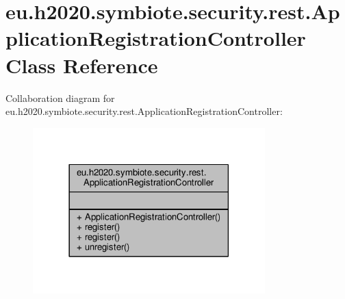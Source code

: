 \hypertarget{classeu_1_1h2020_1_1symbiote_1_1security_1_1rest_1_1ApplicationRegistrationController}{}\section{eu.\+h2020.\+symbiote.\+security.\+rest.\+Application\+Registration\+Controller Class Reference}
\label{classeu_1_1h2020_1_1symbiote_1_1security_1_1rest_1_1ApplicationRegistrationController}


Collaboration diagram for eu.\+h2020.\+symbiote.\+security.\+rest.\+Application\+Registration\+Controller\+:
\nopagebreak
\begin{figure}[H]
\begin{center}
\leavevmode
\includegraphics[width=254pt]{classeu_1_1h2020_1_1symbiote_1_1security_1_1rest_1_1ApplicationRegistrationController__coll__graph}
\end{center}
\end{figure}

